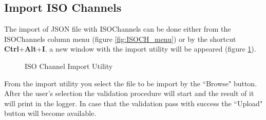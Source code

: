 \subsection{Import ISO Channels}
The import of JSON file with ISOChannels can be done either from the ISOChannels column menu (figure \ref{fig:ISOCH_menu})
or by the shortcut \textbf{Ctrl}+\textbf{Alt}+\textbf{I}.
a new window with the import utility will be appeared (figure \ref{fig:imp_win}).
\begin{figure}[h]
\centering
	\caption{ISO Channel Import Utility}
	\label{fig:imp_win}
\end{figure}

From the import utility you select the file to be import by the ``Browse" button.
After the user's selection the validation procedure will start and the result of it will print in the logger.
In case that the validation pass with success the ``Upload" button will become available.
